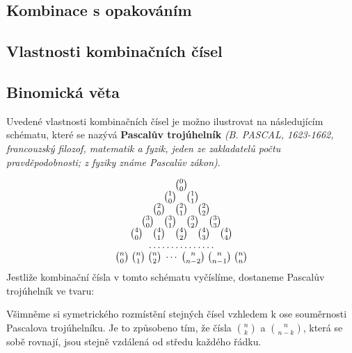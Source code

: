       \subsection{Kombinace s opakováním}\label{mai:IchapIVsecIssecVII}
      \subsection{Vlastnosti kombinačních čísel}\label{mai:IchapIVsecIssecVIII}
      \subsection{Binomická věta}\label{mai:IchapIVsecIssecIX}
        
      
        Uvedené vlastnosti kombinačních čísel je možno ilustrovat na následujícím schématu, které se
        nazývá \textbf{Pascalův trojúhelník} \emph{(B. PASCAL, 1623-1662, francouzský filozof,
        matematik a fyzik, jeden ze zakladatelů počtu pravděpodobnosti; z fyziky známe Pascalův
        zákon)}.

        \begin{align*}
          \begin{array}{c} 
            \binom{0}{0}                                                                          \\
            \binom{1}{0}\quad \binom{1}{1}                                                        \\  
            \binom{2}{0}\quad \binom{2}{1}\quad \binom{2}{2}                                      \\ 
            \binom{3}{0}\quad \binom{3}{1}\quad \binom{3}{2}\quad \binom{3}{3}                    \\ 
            \binom{4}{0}\quad \binom{4}{1}\quad \binom{4}{2}\quad \binom{4}{3}\quad  \binom{4}{4} \\ 
            \hdotsfor{1}                                                                          \\
            \binom{n}{0}\; \binom{n}{1}\; \binom{n}{2}\; \cdots\; 
            \binom{n}{n-2}\; \binom{n}{n-1}\; \binom{n}{n}                                        \\ 
          \end{array}
        \end{align*}
        Jestliže kombinační čísla v tomto schématu vyčíslíme, dostaneme Pascalův trojúhelník ve tvaru:

        Všimněme si symetrického rozmístění stejných čísel vzhledem k ose souměrnosti Pascalova
        trojúhelníku. Je to způsobeno tím, že čísla \(\binom{n}{k}\) a \(\binom{n}{n-k}\), která se
        sobě rovnají, jsou stejně vzdálená od středu každého řádku.

